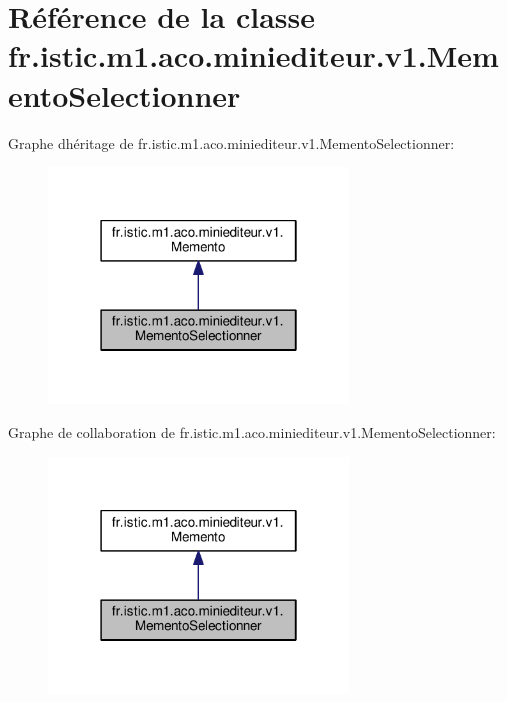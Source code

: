 \hypertarget{classfr_1_1istic_1_1m1_1_1aco_1_1miniediteur_1_1v1_1_1MementoSelectionner}{}\section{Référence de la classe fr.\+istic.\+m1.\+aco.\+miniediteur.\+v1.\+Memento\+Selectionner}
\label{classfr_1_1istic_1_1m1_1_1aco_1_1miniediteur_1_1v1_1_1MementoSelectionner}


Graphe d\textquotesingle{}héritage de fr.\+istic.\+m1.\+aco.\+miniediteur.\+v1.\+Memento\+Selectionner\+:\nopagebreak
\begin{figure}[H]
\begin{center}
\leavevmode
\includegraphics[width=226pt]{classfr_1_1istic_1_1m1_1_1aco_1_1miniediteur_1_1v1_1_1MementoSelectionner__inherit__graph}
\end{center}
\end{figure}


Graphe de collaboration de fr.\+istic.\+m1.\+aco.\+miniediteur.\+v1.\+Memento\+Selectionner\+:\nopagebreak
\begin{figure}[H]
\begin{center}
\leavevmode
\includegraphics[width=226pt]{classfr_1_1istic_1_1m1_1_1aco_1_1miniediteur_1_1v1_1_1MementoSelectionner__coll__graph}
\end{center}
\end{figure}
